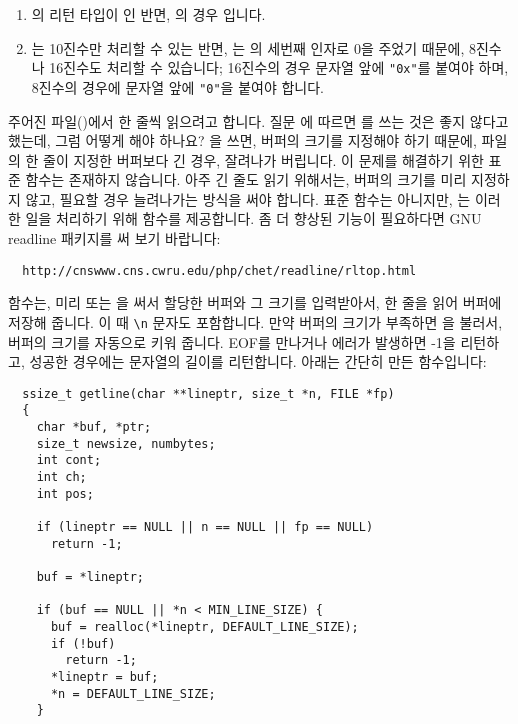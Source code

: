 \begin{faq}
\begin{enumerate}
\item
	의 리턴 타입이 인 반면, 의 경우
	입니다.

\item
	는 10진수만 처리할 수 있는 반면, 는
	의 세번째 인자로 0을 주었기 때문에, 8진수나 16진수도
	처리할 수 있습니다; 16진수의 경우 문자열 앞에 \verb+"0x"+를 붙여야
	하며, 8진수의 경우에 문자열 앞에 \verb+"0"+을 붙여야 합니다.
\end{enumerate}

\end{faq}

\begin{faq}
	주어진 파일()에서 한 줄씩 읽으려고 합니다. 질문 에
        따르면 를 쓰는 것은 좋지 않다고 했는데, 그럼 어떻게 해야 하나요?
        을 쓰면, 버퍼의 크기를 지정해야 하기 때문에, 파일의 한 줄이
        지정한 버퍼보다 긴 경우, 잘려나가 버립니다.
\A
	이 문제를 해결하기 위한 표준 함수는 존재하지 않습니다. 아주 긴 줄도
        읽기 위해서는, 버퍼의 크기를 미리 지정하지 않고, 필요할 경우 늘려나가는
        방식을 써야 합니다. 표준 함수는 아니지만, \cite{glibc}는 이러한 일을
        처리하기 위해  함수를 제공합니다. 좀 더 향상된 기능이 필요하다면
        GNU readline 패키지를 써 보기 바랍니다:
\begin{verbatim}
  http://cnswww.cns.cwru.edu/php/chet/readline/rltop.html
\end{verbatim}

	 함수는, 미리  또는 을 써서
        할당한 버퍼와 그 크기를 입력받아서, 한 줄을 읽어 버퍼에 저장해 줍니다.
        이 때 \verb+\n+ 문자도 포함합니다.
        만약 버퍼의 크기가 부족하면 을 불러서, 버퍼의 크기를 자동으로
        키워 줍니다. EOF를 만나거나 에러가 발생하면 -1을 리턴하고, 성공한 경우에는
        문자열의 길이를 리턴합니다. 아래는 간단히 만든  함수입니다:

\begin{verbatim}
  ssize_t getline(char **lineptr, size_t *n, FILE *fp)
  {
    char *buf, *ptr;
    size_t newsize, numbytes;
    int cont;
    int ch;
    int pos;

    if (lineptr == NULL || n == NULL || fp == NULL)
      return -1;

    buf = *lineptr;

    if (buf == NULL || *n < MIN_LINE_SIZE) {
      buf = realloc(*lineptr, DEFAULT_LINE_SIZE);
      if (!buf)
        return -1;
      *lineptr = buf;
      *n = DEFAULT_LINE_SIZE;
    }


\end{verbatim}
\end{faq}
